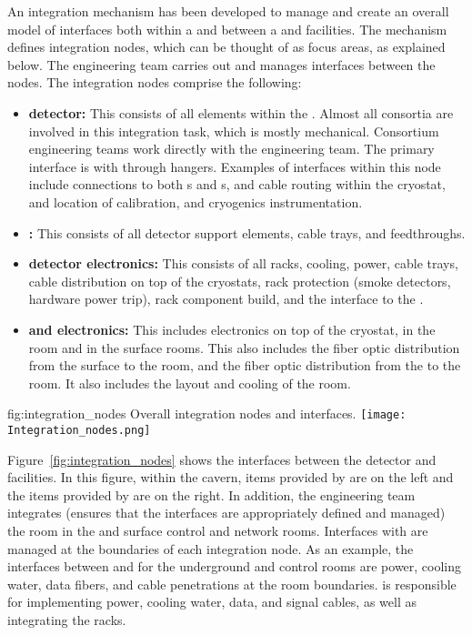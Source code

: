 An integration mechanism has been developed to manage and create an
overall model of interfaces both within a  and
between a  and facilities. The mechanism defines
integration nodes, which can be thought of as focus areas, as
explained below.  The  engineering team carries out and
manages interfaces between the nodes. The integration nodes comprise the following:
\begin{itemize}
\item {\bf detector:} This consists of all  elements within
  the . Almost all consortia are involved in this
  integration task, which is mostly mechanical. Consortium engineering
  teams work directly with the  engineering team.  The
  primary interface is with  through hangers. Examples of
  interfaces within this node include   connections to both
  s and s,  and  cable
  routing within the cryostat, and location of calibration, and
  cryogenics instrumentation.
\item {\bf {}:} This consists of all detector support elements,
  cable trays, and feedthroughs.
\item {\bf detector electronics:} This consists of all racks, cooling,
  power, cable trays, cable distribution on top of the cryostats, rack
  protection (smoke detectors, hardware power trip), rack component
  build, and the interface to the .
\item {\bf {} and electronics:} This includes electronics on
  top of the cryostat, in the  room and in the surface
  rooms. This also includes the fiber optic distribution from the
  surface to the  room, and the fiber optic distribution
  from the  to the  room. It also includes the
  layout and cooling of the  room.
\end{itemize}

\begin{dunefigure}{fig:integration_nodes}
  {Overall integration nodes and interfaces.}
  \texttt{[image: Integration\_nodes.png]}
\end{dunefigure}
Figure~\ref{fig:integration_nodes} shows the interfaces between the
detector and facilities. In this figure, within the cavern, items
provided by  are on the left and the items provided by
 are on the right. In addition, the  engineering
team integrates (ensures that the interfaces are appropriately defined
and managed) the  room in the  and surface
control and network rooms. Interfaces with 
are managed at the boundaries of each integration node. As an example,
the interfaces between  and  for the
underground  and control rooms are power, cooling water,
data fibers, and cable penetrations at the room
boundaries.  is responsible for implementing power,
cooling water, data, and signal cables, as well as integrating the
racks.


